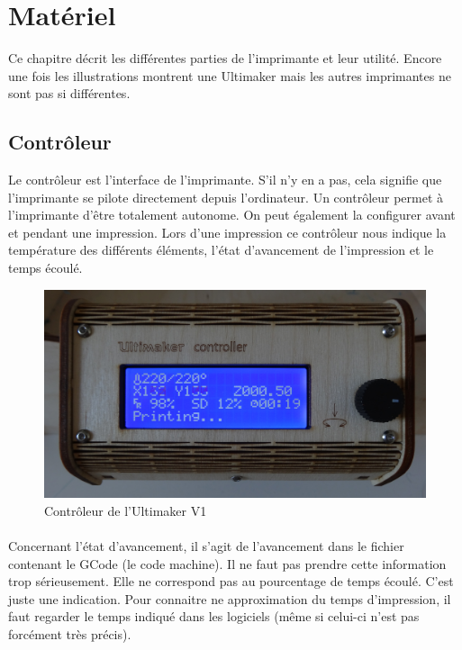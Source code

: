 
\section{Matériel}

Ce chapitre décrit les différentes parties de l'imprimante et leur utilité. Encore une fois les illustrations montrent une Ultimaker mais les autres imprimantes ne sont pas si différentes.

\subsection{Contrôleur}

Le contrôleur est l'interface de l'imprimante. S'il n'y en a pas, cela signifie que l'imprimante se pilote directement depuis l'ordinateur. Un contrôleur permet à l'imprimante d'être totalement autonome. On peut également la configurer avant et pendant une impression. Lors d'une impression ce contrôleur nous indique la température des différents éléments, l'état d'avancement de l'impression et le temps écoulé.

\begin{figure}[H]
	\centering
	\includegraphics[width=50ex]{02_materiel/controller.jpg}  
	\caption{Contrôleur de l'Ultimaker V1}
	\label{fig:controller}
\end{figure}

\paragraph{} Concernant l'état d'avancement, il s'agit de l'avancement dans le fichier contenant le GCode (le code machine). Il ne faut pas prendre cette information trop sérieusement. Elle ne correspond pas au pourcentage de temps écoulé. C'est juste une indication. Pour connaitre ne approximation du temps d'impression, il faut regarder le temps indiqué dans les logiciels (même si celui-ci n'est pas forcément très précis).

